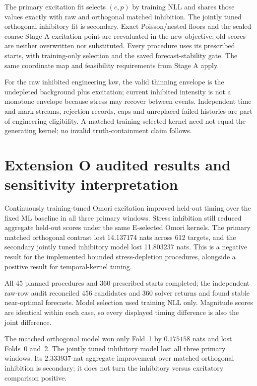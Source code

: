 The primary excitation fit selects $(c,p)$ by training NLL and shares those
values exactly with raw and orthogonal matched inhibition. The jointly tuned
orthogonal inhibitory fit is secondary. Exact Poisson/nested floors and the
sealed coarse Stage A excitation point are reevaluated in the new objective;
old scores are neither overwritten nor substituted. Every procedure uses its
prescribed starts, with training-only selection and the saved forecast-stability
gate. The same coordinate map and feasibility requirements from Stage A apply.

For the raw inhibited engineering law, the valid thinning envelope is the
undepleted background plus excitation; current inhibited intensity is not a
monotone envelope because stress may recover between events. Independent time
and mark streams, rejection records, caps and unreplaced failed histories are
part of engineering eligibility. A matched training-selected kernel need not
equal the generating kernel; no invalid truth-containment claim follows.
\section{Extension O audited results and sensitivity interpretation}


Continuously training-tuned Omori excitation improved held-out timing over the fixed ML baseline in all three primary windows. Stress inhibition still reduced aggregate held-out scores under the same E-selected Omori kernels. The primary matched orthogonal contrast lost 14.137174 nats across 612 targets, and the secondary jointly tuned inhibitory model lost 11.803237 nats. This is a negative result for the implemented bounded stress-depletion procedures, alongside a positive result for temporal-kernel tuning.

All 45 planned procedures and 360 prescribed starts completed; the independent raw-row audit reconciled 456 candidates and 360 solver returns and found stable near-optimal forecasts. Model selection used training NLL only. Magnitude scores are identical within each case, so every displayed timing difference is also the joint difference.


The matched orthogonal model won only Fold~1 by $0.175158$ nats and lost Folds~0 and~2. The jointly tuned inhibitory model lost all three primary windows. Its $2.333937$-nat aggregate improvement over matched orthogonal inhibition is secondary; it does not turn the inhibitory versus excitatory comparison positive.

